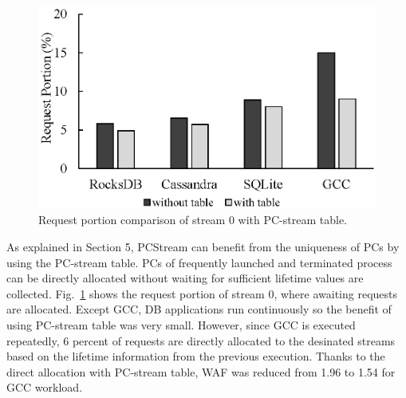 \begin{figure}[t]
	\centering
	\includegraphics[width=0.7\linewidth]{figure/pctable}
	\caption{Request portion comparison of stream 0 with PC-stream table.}
	\label{fig:pctable}
\end{figure}

As explained in Section 5, PCStream can benefit from the uniqueness of PCs
by using the PC-stream table.
PCs of frequently launched and terminated process can be directly allocated without
waiting for sufficient lifetime values are collected.
Fig.~\ref{fig:pctable} shows the request portion of stream 0, where 
awaiting requests are allocated.
Except GCC, DB applications run continuously so the benefit of using PC-stream table
was very small. 
However, since GCC is executed repeatedly, 6 percent of requests are directly
allocated to the desinated streams based on the lifetime information from the 
previous execution. 
Thanks to the direct allocation with PC-stream table, WAF was reduced from 1.96 to 1.54
for GCC workload.


